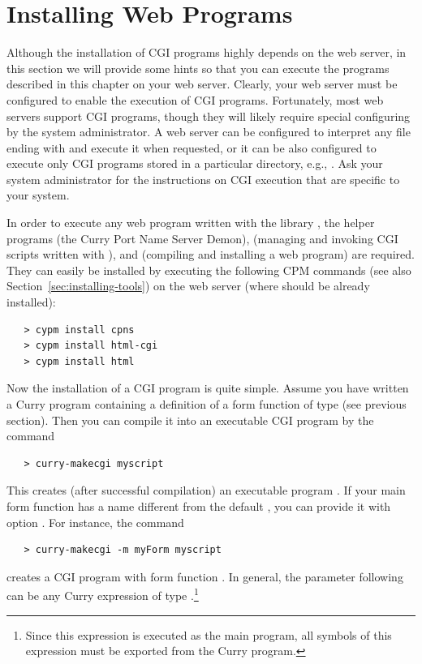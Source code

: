            
\section{Installing Web Programs}
\label{sec-cgi-install}

Although the installation of CGI programs highly depends on the web server,
in this section we will provide some hints so that you can
execute the programs described in this chapter on your web server.
Clearly, your web server must be configured to enable the execution of
CGI programs. Fortunately, most web servers support CGI programs, though
they will likely require special configuring by the system administrator.
A web server can be configured to interpret any file ending
with  and execute it when requested, or it
can be also configured to execute only CGI programs stored
in a particular directory, e.g., .
Ask your system administrator for the instructions
on CGI execution that are specific to your system.

In order to execute any web program written with the
library , the helper programs
 (the Curry Port Name Server Demon),
 (managing and invoking CGI scripts
written with ), and
(compiling and installing a web program)
are required. They can easily be installed by executing
the following CPM commands (see also Section~\ref{sec:installing-tools})
on the web server (where \pakcs should be already installed):
%
\begin{verbatim}
   > cypm install cpns
   > cypm install html-cgi
   > cypm install html
\end{verbatim}
%
Now the installation of a CGI program is quite simple.
Assume you have written a Curry program 
containing a definition of a form function 
of type  (see previous section).
Then you can compile it into an executable CGI program
by the command
%
\begin{verbatim}
   > curry-makecgi myscript
\end{verbatim}
%
This creates (after successful compilation) an executable program
.
If your main form function has a name different from the default ,
you can provide it with option . For instance,
the command
%
\begin{verbatim}
   > curry-makecgi -m myForm myscript
\end{verbatim}
%
creates a CGI program with form function .
In general, the parameter following  can be any Curry expression
of type .\footnote{%
Since this expression is executed as the main program,
all symbols of this expression must be exported from the
Curry program.}

